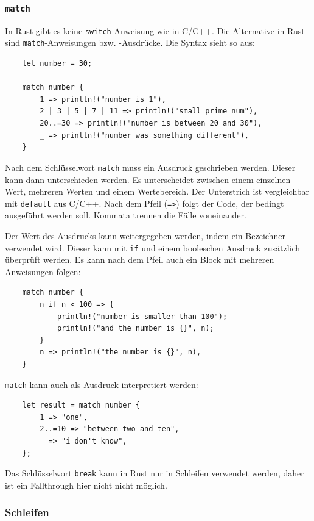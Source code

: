 \subsubsection{\texttt{match}}

In Rust gibt es keine \verb"switch"-Anweisung wie in C/C++. Die Alternative in Rust sind \verb"match"-Anweisungen bzw. -Ausdrücke. Die Syntax sieht so aus:

\begin{lstlisting}
    let number = 30;

    match number {
        1 => println!("number is 1"),
        2 | 3 | 5 | 7 | 11 => println!("small prime num"),
        20..=30 => println!("number is between 20 and 30"),
        _ => println!("number was something different"),
    }
\end{lstlisting}

Nach dem Schlüsselwort \verb"match" muss ein Ausdruck geschrieben werden. Dieser kann dann unterschieden werden. Es unterscheidet zwischen einem einzelnen Wert, mehreren Werten und einem Wertebereich. Der Unterstrich ist ver\-gleich\-bar mit \verb"default" aus C/C++. Nach dem Pfeil (\verb"=>") folgt der Code, der bedingt ausgeführt werden soll. Kommata trennen die Fälle voneinander.

Der Wert des Ausdrucks kann weitergegeben werden, indem ein Bezeichner verwendet wird. Dieser kann mit \verb"if" und einem booleschen Ausdruck zusätzlich überprüft werden. Es kann nach dem Pfeil auch ein Block mit mehreren Anwei\-sungen folgen:

\begin{lstlisting}
    match number {
        n if n < 100 => {
            println!("number is smaller than 100");
            println!("and the number is {}", n);
        }
        n => println!("the number is {}", n),
    }
\end{lstlisting}

\verb"match" kann auch als Ausdruck interpretiert werden:

\begin{lstlisting}
    let result = match number {
        1 => "one",
        2..=10 => "between two and ten",
        _ => "i don't know",
    };
\end{lstlisting}

Das Schlüsselwort \verb"break" kann in Rust nur in Schleifen verwendet werden, daher ist ein \glqq Fallthrough\grqq{} hier nicht nicht möglich.

\subsubsection{Schleifen}


